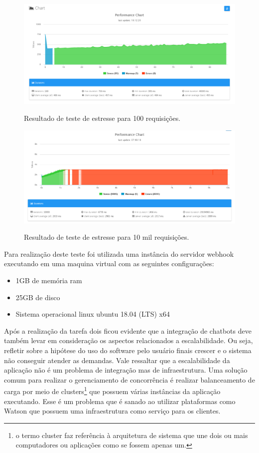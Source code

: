 \begin{figure}[H]
  \centering
   \caption{Resultado de teste de estresse para 100 requisições.}
  \includegraphics[scale=0.5]{Imagens/estrese100.PNG} 
  \label{estresse2}
\end{figure}

\begin{figure}[H]
  \centering
   \caption{Resultado de teste de estresse para 10 mil requisições.}
  \includegraphics[scale=0.5]{Imagens/perfomance10k.PNG} 
  \label{estresse3}
\end{figure}


Para realização deste teste foi utilizada uma instância do servidor webhook executando em uma maquina virtual com as seguintes configurações:

\begin{itemize}
    \item 1GB de memória ram
    \item 25GB de disco
    \item Sistema operacional linux ubuntu 18.04 (LTS) x64 
\end{itemize}


Após a realização da tarefa dois ficou evidente que a integração de chatbots deve também levar em consideração os aspectos relacionados a escalabilidade. Ou seja, refletir sobre a hipótese do uso do software pelo usuário finais crescer e o sistema não conseguir atender as demandas. Vale ressaltar que a escalabilidade da aplicação não é um problema de integração mas de infraestrutura. Uma solução comum para realizar o gerenciamento de concorrência é realizar balanceamento de carga por meio de clusters\footnote{o termo cluster faz referência à arquitetura de sistema que une dois ou mais computadores ou aplicações como se fossem apenas um.} que possuem várias instâncias da aplicação executando. Esse é um problema que é sanado ao utilizar plataformas como Watson que possuem uma infraestrutura como serviço para os clientes.

